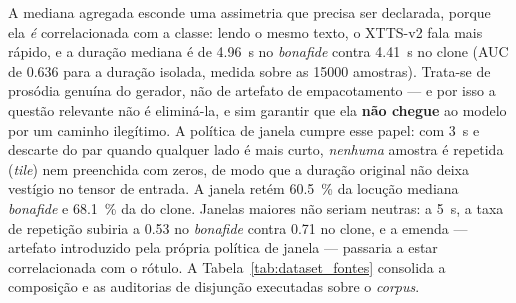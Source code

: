\documentclass[12pt,a4paper]{article}
\begin{document}
A mediana agregada esconde uma assimetria que precisa ser declarada, porque ela
\emph{é} correlacionada com a classe: lendo o mesmo texto, o XTTS-v2 fala mais
rápido, e a duração mediana é de \SI{4,96}{\second} no \textit{bonafide} contra
\SI{4,41}{\second} no clone (AUC de \num{0,636} para a duração isolada, medida
sobre as \num{15000} amostras). Trata-se de prosódia genuína do gerador, não de
artefato de empacotamento --- e por isso a questão relevante não é eliminá-la,
e sim garantir que ela \textbf{não chegue} ao modelo por um caminho ilegítimo.
A política de janela cumpre esse papel: com \SI{3}{\second} e descarte do par
quando qualquer lado é mais curto, \emph{nenhuma} amostra é repetida
(\textit{tile}) nem preenchida com zeros, de modo que a duração original não
deixa vestígio no tensor de entrada. A janela retém \SI{60,5}{\percent} da
locução mediana \textit{bonafide} e \SI{68,1}{\percent} da do clone. Janelas
maiores não seriam neutras: a \SI{5}{\second}, a taxa de repetição subiria a
\num{0,53} no \textit{bonafide} contra \num{0,71} no clone, e a emenda ---
artefato introduzido pela própria política de janela --- passaria a estar
correlacionada com o rótulo. A Tabela~\ref{tab:dataset_fontes} consolida a
composição e as auditorias de disjunção executadas sobre o \textit{corpus}.
\end{document}
